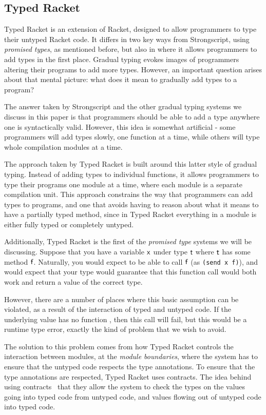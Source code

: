 \documentclass[a4paper,USenglish]{tex/lipics-v2016}
\begin{document}
\subsection{Typed Racket}

Typed Racket is an extension of Racket, designed to allow programmers to type
their untyped Racket code. It differs in two key ways from Strongscript, using \emph{promised
types}, as mentioned before, but also in where it allows
programmers to add types in the first place. Gradual typing evokes images of 
programmers altering their programs to add more types. However, an important question arises about 
that mental picture: what does it mean to gradually add types to a program?

The answer taken by Strongscript and the other gradual typing systems we
discuss in this paper is that programmers should be able to add a type
anywhere one is syntactically valid. However, this idea is somewhat
artificial - some programmers will add types slowly, one function at a time,
while others will type whole compilation modules at a time.

The approach taken by Typed Racket is built around this latter style of
gradual typing.  Instead of adding types to individual functions, it allows
programmers to type their programs one module at a time, where each module
is a separate compilation unit.  This approach constrains the way that
programmers can add types to programs, and one that avoids having to reason
about what it means to have a partially typed method, since in Typed Racket
everything in a module is either fully typed or completely untyped.

Additionally, Typed Racket is the first of the \emph{promised type} systems
we will be discussing. Suppose that you have a variable ${\sf{x}}$ under type ${\sf{t}}$
where ${\sf{t}}$ has some method ${\sf{f}}$. Naturally, you would expect to be able
to call ${\sf{f}}$ (as \verb|(send x f)|), and would expect that your type
would guarantee that this function call would both work and return a value
of the correct type.

However, there are a number of places where this basic assumption can be
violated, as a result of the interaction of typed and untyped code. If the
underlying value has no function , then this call will fail, but this
would be a runtime type error, exactly the kind of problem that we wish to
avoid.

The solution to this problem comes from how Typed Racket controls the interaction between 
modules, at the \emph{module boundaries}, where the system has to ensure that the untyped code
respects the type annotations. To ensure that the type annotations are respected, Typed Racket uses
 contracts. The idea behind using contracts~\cite{findler-hof} that they allow the system
to check the types on the values going into typed code from untyped code, and values
flowing out of untyped code into typed code.
\end{document}
